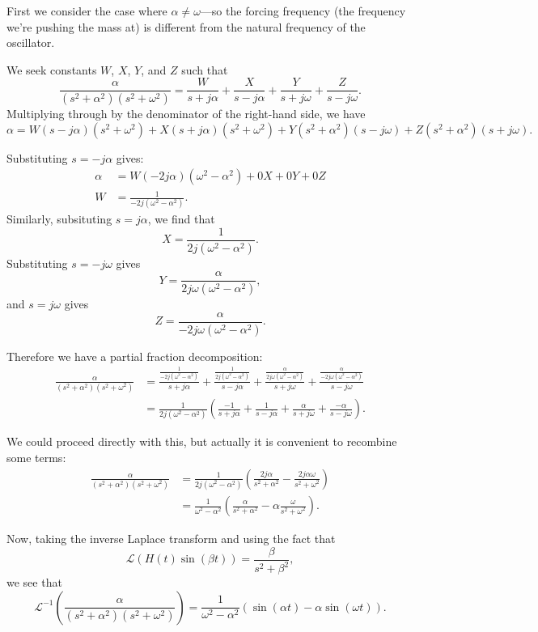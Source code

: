 \documentclass{article}
\begin{document}
First we consider the case where $\alpha\neq \omega$---so the forcing frequency (the frequency we're pushing the mass at) is different from the natural frequency of the oscillator.

We seek constants $W$, $X$, $Y$, and $Z$ such that
\[\frac{\alpha}{(s^2+\alpha^2)(s^2+\omega^2)}=\frac{W}{s+j\alpha}+\frac{X}{s-j\alpha}+\frac{Y}{s+j\omega}+\frac{Z}{s-j\omega}.\]
Multiplying through by the denominator of the right-hand side, we have
\[\alpha=W(s-j\alpha)(s^2+\omega^2) + X(s+j\alpha)(s^2+\omega^2)+Y(s^2+\alpha^2)(s-j\omega)+Z(s^2+\alpha^2)(s+j\omega).\]

Substituting $s=-j\alpha$ gives:
\begin{align*}
	\alpha&=W(-2j\alpha)(\omega^2-\alpha^2)+0X+0Y+0Z\\
	W&=\frac{1}{-2j(\omega^2-\alpha^2)}.
\end{align*}
Similarly, subsituting $s=j\alpha$, we find that
\[X=\frac{1}{2j(\omega^2-\alpha^2)}.\]
Substituting $s=-j\omega$ gives
\[Y=\frac{\alpha}{2j\omega(\omega^2-\alpha^2)},\]
and $s=j\omega$ gives
\[Z=\frac{\alpha}{-2j\omega(\omega^2-\alpha^2)}.\]

Therefore we have a partial fraction decomposition:
\begin{align*}
	\frac{\alpha}{(s^2+\alpha^2)(s^2+\omega^2)}&=\frac{\frac{1}{-2j(\omega^2-\alpha^2)}}{s+j\alpha}+\frac{\frac{1}{2j(\omega^2-\alpha^2)}}{s-j\alpha}+\frac{\frac{\alpha}{2j\omega(\omega^2-\alpha^2)}}{s+j\omega}+\frac{\frac{\alpha}{-2j\omega(\omega^2-\alpha^2)}}{s-j\omega}\\
	&=\frac{1}{2j(\omega^2-\alpha^2)}\left(\frac{-1}{s+j\alpha}+\frac{1}{s-j\alpha}+\frac{\alpha}{s+j\omega}+\frac{-\alpha}{s-j\omega}\right).
\end{align*}

We could proceed directly with this, but actually it is convenient to recombine some terms:
\begin{align*}
	\frac{\alpha}{(s^2+\alpha^2)(s^2+\omega^2)}&=\frac{1}{2j(\omega^2-\alpha^2)}\left(\frac{2j\alpha}{s^2+\alpha^2}-\frac{2j\alpha\omega}{s^2+\omega^2}\right)\\
	&=\frac{1}{\omega^2-\alpha^2}\left(\frac{\alpha}{s^2+\alpha^2}-\alpha\frac{\omega}{s^2+\omega^2}\right).
\end{align*}

Now, taking the inverse Laplace transform and using the fact that
\[\mathcal{L}\left(H(t)\sin(\beta t)\right) = \frac{\beta}{s^2+\beta^2},\]
we see that
\[\mathcal{L}^{-1}\left(\frac{\alpha}{(s^2+\alpha^2)(s^2+\omega^2)}\right) = \frac{1}{\omega^2-\alpha^2}\left(\sin(\alpha t) - \alpha\sin(\omega t)\right).\]\bigskip
\end{document}
